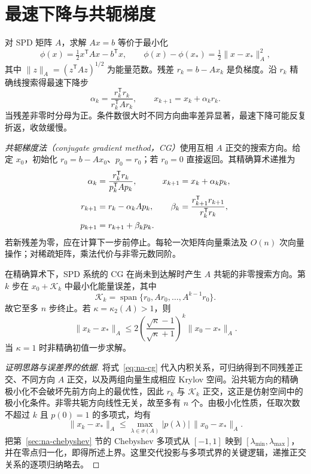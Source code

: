 \documentclass[UTF8,12pt,a4paper,fontset=fandol]{ctexbook}
\begin{document}
\section{最速下降与共轭梯度}
对 SPD 矩阵 $A$，求解 $Ax=b$ 等价于最小化
\[
 \phi(x)=\tfrac12x^{\mathsf T}Ax-b^{\mathsf T}x,
 \qquad \phi(x)-\phi(x_*)=\tfrac12\|x-x_*\|_A^2,
\]
其中 $\|z\|_A=(z^{\mathsf T}Az)^{1/2}$ 为能量范数。残差 $r_k=b-Ax_k$ 是负梯度。沿 $r_k$ 精确线搜索得最速下降步
\[
 \alpha_k=\frac{r_k^{\mathsf T}r_k}{r_k^{\mathsf T}Ar_k},\qquad
 x_{k+1}=x_k+\alpha_kr_k.
\]
当残差非零时分母为正。条件数很大时不同方向曲率差异显著，最速下降可能反复折返，收敛缓慢。

\emph{共轭梯度法（conjugate gradient method，CG）}使用互相 $A$ 正交的搜索方向。给定 $x_0$，初始化 $r_0=b-Ax_0$、$p_0=r_0$；若 $r_0=0$ 直接返回。其精确算术递推为
\begin{align}
 \alpha_k&=\frac{r_k^{\mathsf T}r_k}{p_k^{\mathsf T}Ap_k},&
 x_{k+1}&=x_k+\alpha_kp_k,\notag\\
 r_{k+1}&=r_k-\alpha_kAp_k,&
 \beta_k&=\frac{r_{k+1}^{\mathsf T}r_{k+1}}{r_k^{\mathsf T}r_k},\notag\\
 p_{k+1}&=r_{k+1}+\beta_kp_k.
 \label{eq:na-cg}
\end{align}
若新残差为零，应在计算下一步前停止。每轮一次矩阵向量乘法及 $O(n)$ 次向量操作；对稀疏矩阵，乘法代价与非零元数同阶。

\begin{theorem}[CG 的投影性质与误差界]
\label{thm:na-cg}
在精确算术下，SPD 系统的 CG 在尚未到达解时产生 $A$ 共轭的非零搜索方向。第 $k$ 步在 $x_0+\mathcal K_k$ 中最小化能量误差，其中
\[
 \mathcal K_k=\operatorname{span}\{r_0,Ar_0,\ldots,A^{k-1}r_0\}.
\]
故它至多 $n$ 步终止。若 $\kappa=\kappa_2(A)>1$，则
\[
 \|x_k-x_*\|_A\le
 2\left(\frac{\sqrt\kappa-1}{\sqrt\kappa+1}\right)^k\|x_0-x_*\|_A.
\]
当 $\kappa=1$ 时非精确初值一步求解。
\end{theorem}
\begin{proof}[证明思路与误差界的依据]
将式~\eqref{eq:na-cg} 代入内积关系，可归纳得到不同残差正交、不同方向 $A$ 正交，以及两组向量生成相应 Krylov 空间。沿共轭方向的精确极小化不会破坏先前方向上的最优性，因此 $r_k$ 与 $\mathcal K_k$ 正交，这正是仿射空间中的极小化条件。非零共轭方向线性无关，故至多有 $n$ 个。由极小化性质，任取次数不超过 $k$ 且 $p(0)=1$ 的多项式，均有
\[
 \|x_k-x_*\|_A\le\max_{\lambda\in\sigma(A)}|p(\lambda)|\,\|x_0-x_*\|_A.
\]
把第~\ref{sec:na-chebyshev} 节的 Chebyshev 多项式从 $[-1,1]$ 映到 $[\lambda_{\min},\lambda_{\max}]$，并在零点归一化，即得所述上界。这里交代投影与多项式界的关键逻辑，递推正交关系的逐项归纳略去。
\end{proof}
\end{document}
